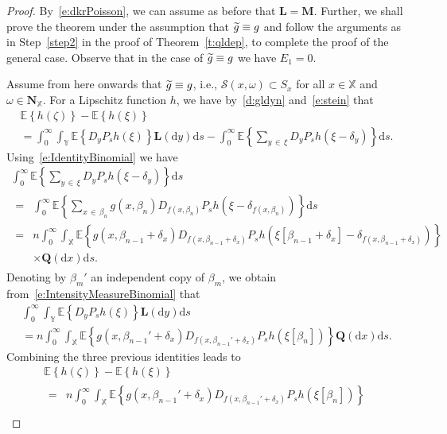 \documentclass[10pt]{amsart}
\theoremstyle{definition}\newtheorem{defi}[theo]{Definition}\newtheorem{rema}[theo]{Remark}\newtheorem{exam}[theo]{Example}\newtheorem{exem}[theo]{Example}\newtheorem{nota}[theo]{Notation}
\newcommand*\bL{\mathbf{L}}
\newcommand*\bM{\mathbf{M}}
\newcommand*\bN{\mathbf{N}}
\newcommand{\bQ}{\mathbf{Q}}
\newcommand*\X{\mathbb{X}}
\newcommand*\Y{\mathbb{Y}}
\newcommand{\E}{\mathbb{E}}
\newcommand*\cS{\mathcal{S}}
\newcommand*\md{\mathrm{d}}
\newcommand{\mean}[1] {\E\left\{{#1}\right\}}
\newcommand{\tg}{\tilde{g}}
\let\oldtilde\tilde
\renewcommand*{\tilde}[1]{\mathchoice{\widetilde{#1}}{\widetilde{#1}}{\oldtilde{#1}}{\oldtilde{#1}}}
\begin{document}
\begin{proof}
By~\eqref{e:dkrPoisson}, we can assume as before that $\bL=\bM$. Further, we shall prove the theorem under the assumption that $\tg \equiv g$ and follow the arguments as in Step~\ref{step2} in the proof of Theorem~\ref{t:qldep}, to complete the proof of the general case. Observe that in the case of $\tg \equiv g$ we have $E_1 = 0$.

Assume from here onwards that $\tg \equiv g$, {i.e., $\cS(x,\omega) \subset S_{x}$} for all $x \in \X$ and {$\omega\in\bN_{\X}$.} For a Lipschitz function $h$, we have by~\eqref{d:gldyn} and~\eqref{e:stein} that
\begin{multline*}
\mean{h(\zeta)} - \mean{h(\xi)}\\
= \int_0^\infty \int_{\Y} \mean{D_yP_sh(\xi)} \bL(\md y) \md s - \int_0^\infty \mean{\sum_{y\,\in\,\xi} D_yP_sh\left(\xi-\delta_y\right)} \md s.
\end{multline*}
Using~\eqref{e:IdentityBinomial} we have
\begin{multline*}
\int_0^\infty \mean{\sum_{y\,\in\,\xi} D_yP_sh\left(\xi-\delta_y\right)} \md s \\
\begin{aligned}
 =& \int_0^\infty \mean{\sum_{x\,\in\,\beta_n} g\left(x,\beta_n\right) D_{f\left(x,\beta_n\right)}P_sh\left(\xi-\delta_{f\left(x,\beta_n\right)}\right)} \md s \\
=&  n \int_0^\infty \int_{\X} \mean{g\left(x,\beta_{n-1}+\delta_x\right) D_{f\left(x,\beta_{n-1}+\delta_x\right)}P_sh\left(\xi\left[\beta_{n-1}+\delta_x\right]-\delta_{f\left(x,\beta_{n-1}+\delta_x\right)}\right)}\\
&\times \bQ(\md x) \md s.
\end{aligned}
\end{multline*}
Denoting by $\beta_m'$ an independent copy of $\beta_m$, we obtain from~\eqref{e:IntensityMeasureBinomial} that
\begin{multline*}
\int_0^\infty \int_{\Y} \mean{D_yP_sh(\xi)} \bL(\md y) \md s\\
 = n \int_0^\infty \int_{\X} \mean{g\left(x,\beta_{n-1}'+\delta_x\right) D_{f\left(x,\beta_{n-1}'+\delta_x\right)}P_sh\left(\xi\left[\beta_n\right]\right)} \bQ(\md x) \md s.
\end{multline*}
Combining the three previous identities leads to
\begin{multline*}
\mean{h(\zeta)} - \mean{h(\xi)}\\
\begin{aligned}
=& n \int_0^\infty \int_{\X} \mean{g\left(x,\beta_{n-1}'+\delta_x\right) D_{f\left(x,\beta_{n-1}'+\delta_x\right)}P_sh\left(\xi\left[\beta_n\right]\right) } \\

\end{aligned}
\end{multline*}
\end{proof}
\end{document}
